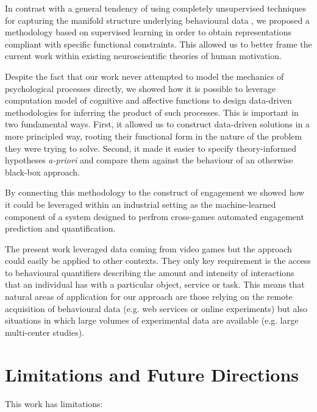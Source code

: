 In contrast with a general tendency of using completely unsupervised techniques for capturing the manifold structure underlying behavioural data \cite{calhoun2019unsupervised, luxem2020identifying, pereira2020quantifying, shi2021learning, mccullough2021unsupervised}, we proposed a methodology based on supervised learning in order to obtain representations compliant with specific functional constraints. This allowed us to better frame the current work within existing neuroscientific theories of human motivation. 

Despite the fact that our work never attempted to model the mechanics of psychological processes directly, we showed how it is possible to leverage computation model of cognitive and affective functions to design data-driven methodologies for inferring the product of such processes. This is important in two fundamental ways. First, it allowed us to construct data-driven solutions in a more principled way, rooting their functional form in the nature of the problem they were trying to solve. Second, it made it easier to specify theory-informed hypotheses \textit{a-priori} and compare them against the behaviour of an otherwise black-box approach.

By connecting this methodology to the construct of engagement we showed how it could be leveraged within an industrial setting as the machine-learned component of a system designed to perfrom cross-games automated engagement prediction and quantification.

The present work leveraged data coming from video games but the approach could easily be applied to other contexts. They only key requirement is the access to behavioural quantifiers describing the amount and intensity of interactions that an individual has with a particular object, service or task. This means that natural areas of application for our approach are those relying on the remote acquisition of behavioural data (e.g. web services or online experiments) but also situations in which large volumes of experimental data are available (e.g. large multi-center studies).

\section{Limitations and Future Directions}
\label{discussion_limitations}
This work has limitations:

